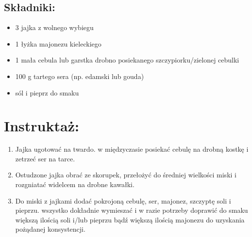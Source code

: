 \documentclass[a4paper,10pt]{book}
\begin{document}
\begin{multicols}{2}

\section*{Składniki:}
\begin{itemize}
    \item 3 jajka z wolnego wybiegu
    \item 1 łyżka majonezu kieleckiego
    \item 1 mała cebula lub garstka drobno posiekanego szczypiorku/zielonej cebulki
    \item 100 g tartego sera (np. edamski lub gouda)
    \item sól i pieprz do smaku
\end{itemize}

\columnbreak

\begin{figure}[H]
    \centering
\end{figure}
\end{multicols}

\vspace{0.5cm} 

\section*{Instruktaż:}
\begin{enumerate}
    \item Jajka ugotować na twardo. w międzyczasie posiekać cebulę na drobną kostkę i zetrzeć ser na tarce.
    \item Ostudzone jajka obrać ze skorupek, przełożyć do średniej wielkości miski i rozgniatać widelcem na drobne kawałki.
    \item Do miski z jajkami dodać pokrojoną cebulę, ser, majonez, szczyptę soli i pieprzu. wszystko dokładnie wymieszać i w razie potrzeby doprawić do smaku większą ilością soli i/lub pieprzu bądź większą ilością majonezu do uzyskania pożądanej konsystencji.
\end{enumerate}
\end{document}
